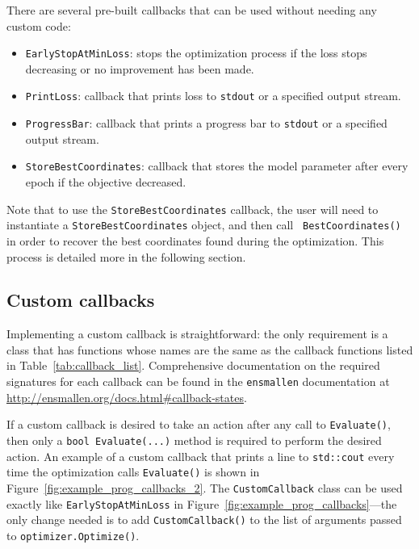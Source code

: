There are several pre-built callbacks that can be used without
needing any custom code:

\begin{itemize}
  \item {\tt EarlyStopAtMinLoss}: stops the optimization process if the loss
stops decreasing or no improvement has been made.

  \item {\tt PrintLoss}: callback that prints loss to {\tt stdout} or a
specified output stream.

  \item {\tt ProgressBar}: callback that prints a progress bar to {\tt stdout}
or a specified output stream.

  \item {\tt StoreBestCoordinates}: callback that stores the model parameter
after every epoch if the objective decreased.
\end{itemize}

Note that to use the {\tt StoreBestCoordinates} callback, the user will need to
instantiate a {\tt StoreBestCoordinates} object, and then call {\tt
BestCoordinates()} in order to recover the best coordinates found during the
optimization.  This process is detailed more in the following section.

\subsection{Custom callbacks}

Implementing a custom callback is straightforward:
the only requirement is a class that has functions whose names are the same as the callback
functions listed in Table~\ref{tab:callback_list}.
Comprehensive documentation on the required signatures for each callback can be
found in the {\tt ensmallen} documentation at
\url{http://ensmallen.org/docs.html#callback-states}.

If a custom callback is desired to take an action after any call
to {\tt Evaluate()}, then only a {\tt bool Evaluate(...)} method is required
to perform the desired action.
An example of a custom callback that 
prints a line to {\tt std::cout} every time the optimization calls
{\tt Evaluate()} is shown in Figure~\ref{fig:example_prog_callbacks_2}.
The {\tt CustomCallback} class can be used exactly like {\tt EarlyStopAtMinLoss}
in Figure~\ref{fig:example_prog_callbacks}---the only change
needed is to add {\tt CustomCallback()} to the list of arguments passed to
{\tt optimizer.Optimize()}.


